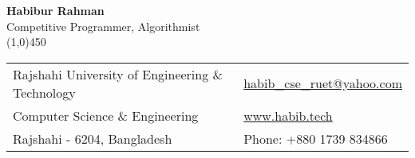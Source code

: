 \documentclass[letterpaper,11pt,oneside]{article}
\begin{document}

\center  \LARGE{\textbf{Habibur Rahman}} \\ \small{Competitive Programmer, Algorithmist} \\
\vspace{-1ex}
{\line(1,0){450}}
\normalsize


\begin{center}
\begin{tabular}{l l}
 Rajshahi University of Engineering \& Technology    & \hspace{1in} \href{mailto:habib_cse_ruet@yahoo.com}{habib\_cse\_ruet@yahoo.com} \\
 Computer Science \& Engineering    & \hspace{1in}  \href{www.habib.tech}{www.habib.tech}   \\
           
 Rajshahi - 6204, Bangladesh & \hspace{1in} Phone: +880 1739 834866 \\
\end{tabular}
\end{center}
\end{document}
